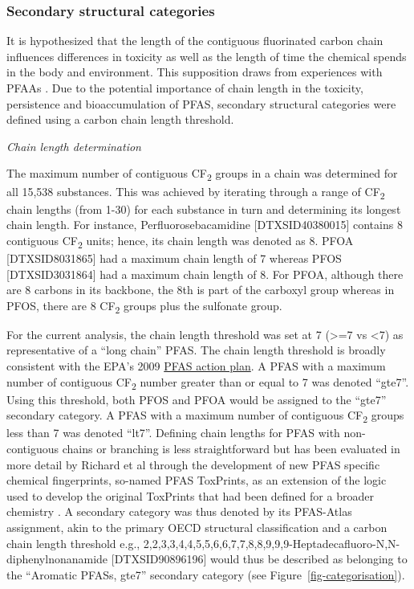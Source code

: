 \documentclass[
  super,
  preprint,
  3p]{elsarticle}
\begin{document}
\hypertarget{secondary-structural-categories}{%
\subsubsection{Secondary structural
categories}\label{secondary-structural-categories}}

It is hypothesized that the length of the contiguous fluorinated carbon
chain influences differences in toxicity as well as the length of time
the chemical spends in the body and environment. This supposition draws
from experiences with PFAAs
\citep{chambers_review_2021, sznajder-katarzynska_review_2019}. Due to
the potential importance of chain length in the toxicity, persistence
and bioaccumulation of PFAS, secondary structural categories were
defined using a carbon chain length threshold.

\emph{Chain length determination}

The maximum number of contiguous CF\textsubscript{2} groups in a chain
was determined for all 15,538 substances. This was achieved by iterating
through a range of CF\textsubscript{2} chain lengths (from 1-30) for
each substance in turn and determining its longest chain length. For
instance, Perfluorosebacamidine {[}DTXSID40380015{]} contains 8
contiguous CF\textsubscript{2} units; hence, its chain length was
denoted as 8. PFOA {[}DTXSID8031865{]} had a maximum chain length of 7
whereas PFOS {[}DTXSID3031864{]} had a maximum chain length of 8. For
PFOA, although there are 8 carbons in its backbone, the 8th is part of
the carboxyl group whereas in PFOS, there are 8 CF\textsubscript{2}
groups plus the sulfonate group.

For the current analysis, the chain length threshold was set at 7
(\textgreater=7 vs \textless7) as representative of a ``long chain''
PFAS. The chain length threshold is broadly consistent with the EPA's
2009
\href{https://www.epa.gov/sites/default/files/2016-01/documents/pfcs_action_plan1230_09.pdf}{PFAS
action plan}. A PFAS with a maximum number of contiguous
CF\textsubscript{2} number greater than or equal to 7 was denoted
``gte7''. Using this threshold, both PFOS and PFOA would be assigned to
the ``gte7'' secondary category. A PFAS with a maximum number of
contiguous CF\textsubscript{2} groups less than 7 was denoted ``lt7''.
Defining chain lengths for PFAS with non-contiguous chains or branching
is less straightforward but has been evaluated in more detail by Richard
et al \citep{richard_identification_2022, richard_new_2023} through the
development of new PFAS specific chemical fingerprints, so-named PFAS
ToxPrints, as an extension of the logic used to develop the original
ToxPrints that had been defined for a broader chemistry
\citep{yang_new_2015}. A secondary category was thus denoted by its
PFAS-Atlas assignment, akin to the primary OECD structural
classification and a carbon chain length threshold e.g.,
2,2,3,3,4,4,5,5,6,6,7,7,8,8,9,9,9-Heptadecafluoro-N,N-diphenylnonanamide
{[}DTXSID90896196{]} would thus be described as belonging to the
``Aromatic PFASs, gte7'' secondary category (see
Figure~\ref{fig-categorisation}).
\end{document}

